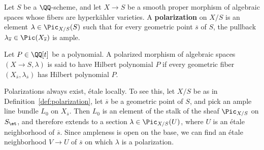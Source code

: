 \begin{definition}\label{def:polarization}
Let $S$ be a $\QQ$-scheme, and let $X \rightarrow S$ be a smooth proper morphism of algebraic spaces whose fibers are hyperk\"ahler varieties. A {\bfseries polarization} on $X/S$ is an element $\lambda \in \Pic_{{X}/{S}}(S)$ such that for every geometric point $\overline{s}$ of $S$, the pullback $\lambda_{\overline{s}} \in \Pic(X_{\overline{s}})$ is ample.  %

Let $P \in \QQ[t]$ be a polynomial. A polarized morphism of algebraic spaces $(X \rightarrow S, \lambda)$ is said to have Hilbert polynomial $P$ if every geometric fiber $(X_{\overline{s}}, \lambda_{\overline{s}})$ has Hilbert polynomial $P$.
\end{definition}

\begin{remark}\label{rk:local_polarizability} 
Polarizations always exist, \'etale locally. To see this, let $X/S$ be as in Definition~\ref{def:polarization}, let $\overline{s}$ be a geometric point of $S$, and pick an ample line bundle $L_0$ on $X_{\overline{s}}$. Then $L_0$ is an element of the stalk of the sheaf $\Pic_{X/S}$ on $S_{\et}$, and therefore extends to a section $\lambda \in \Pic_{X/S}(U)$, where $U$ is an \'etale neighborhood of $\overline{s}$. Since ampleness is open on the base, we can find an \'etale neighborhood $V \rightarrow U$ of $\overline{s}$ on which $\lambda$ is a polarization.
\end{remark}

